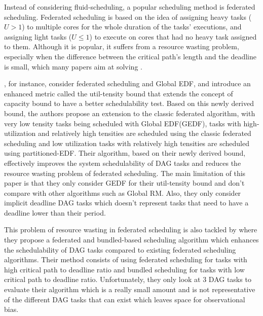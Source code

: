 Instead of considering fluid-scheduling,
a popular scheduling method is federated scheduling.
Federated scheduling is based on the idea
of assigning heavy tasks ($U > 1$) to multiple cores
for the whole duration of the tasks' executions,
and assigning light tasks ($U \le 1$) to execute on
cores that had no heavy task assigned to them.
Although it is popular, it suffers from a resource wasting problem,
especially when the difference between the critical path's length 
and the deadline is small,
which many papers aim at solving
\cite{Guan2023FederatedNew}
\cite{jiangUtilTensityBound}
\cite{JiangVirtuallyFederatedSched2021}
\cite{Jiang2023SchedVirtualProcs}
\cite{Kobayashi2023FedBundledDagsched}
\cite{He2023DegreeOfParallelism}.

\citet{jiangUtilTensityBound}, for instance, 
consider federated scheduling and Global EDF,
and introduce an enhanced metric called the util-tensity bound
that extends the concept of capacity bound
to have a better schedulability test.
Based on this newly derived bound, the authors 
propose an extension to the classic federated algorithm,
with very low tensity tasks being scheduled with Global EDF(GEDF), 
tasks with high-utilization and relatively high tensities are scheduled
using the classic federated scheduling and low utilization
tasks with relatively high tensities are scheduled using partitioned-EDF.
Their algorithm, based on their newly derived bound, effectively improves
the system schedulability of DAG tasks and reduces the resource wasting 
problem of federated scheduling. The main limitation
of this paper is that they only consider GEDF 
for their util-tensity bound and
don't compare with other algorithms such as Global RM.
Also, they only consider implicit deadline DAG tasks
which doesn't represent tasks that need to have a deadline 
lower than their period.

This problem of resource wasting in federated scheduling
is also tackled by \citet{Kobayashi2023FedBundledDagsched}
where they propose a federated and bundled-based scheduling
algorithm which enhances the schedulability of DAG tasks
compared to existing federated scheduling algorithms.
Their method consists of using federated scheduling for
tasks with high critical path to deadline ratio and bundled
scheduling for tasks with low critical path to deadline ratio.
Unfortunately, they only look at 3 DAG tasks to evaluate
their algorithm which is a really small amount and is not 
representative of the different DAG tasks that can exist
which leaves space for observational bias.

